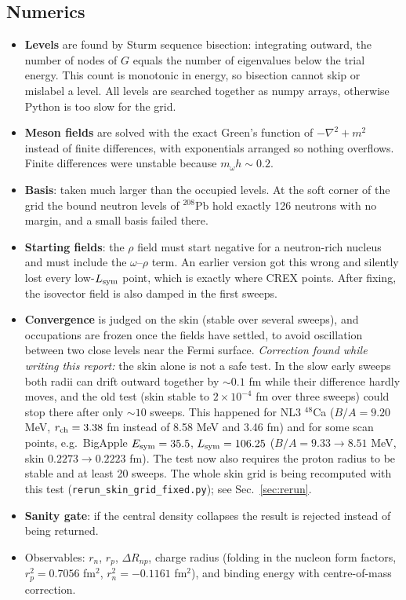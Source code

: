 \documentclass[11pt,a4paper]{article}
\newcommand{\Esym}{E_{\rm sym}}
\newcommand{\Lsym}{L_{\rm sym}}
\newcommand{\DRnp}{\Delta R_{np}}
\begin{document}
\subsection{Numerics}
\begin{itemize}
\item \textbf{Levels} are found by Sturm sequence bisection: integrating outward, the number of nodes of $G$ equals the number of eigenvalues below the trial energy. This count is monotonic in energy, so bisection cannot skip or mislabel a level. All levels are searched together as numpy arrays, otherwise Python is too slow for the grid.
\item \textbf{Meson fields} are solved with the exact Green's function of $-\nabla^2+m^2$ instead of finite differences, with exponentials arranged so nothing overflows. Finite differences were unstable because $m_\omega h\sim0.2$.
\item \textbf{Basis}: taken much larger than the occupied levels. At the soft corner of the grid the bound neutron levels of $^{208}$Pb hold exactly 126 neutrons with no margin, and a small basis failed there.
\item \textbf{Starting fields}: the $\rho$ field must start negative for a neutron-rich nucleus and must include the $\omega$--$\rho$ term. An earlier version got this wrong and silently lost every low-$\Lsym$ point, which is exactly where CREX points. After fixing, the isovector field is also damped in the first sweeps.
\item \textbf{Convergence} is judged on the skin (stable over several sweeps), and occupations are frozen once the fields have settled, to avoid oscillation between two close levels near the Fermi surface. \emph{Correction found while writing this report:} the skin alone is not a safe test. In the slow early sweeps both radii can drift outward together by $\sim0.1$ fm while their difference hardly moves, and the old test (skin stable to $2\times10^{-4}$ fm over three sweeps) could stop there after only $\sim10$ sweeps. This happened for NL3 $^{48}$Ca ($B/A=9.20$ MeV, $r_{\rm ch}=3.38$ fm instead of 8.58 MeV and 3.46 fm) and for some scan points, e.g.\ BigApple $\Esym=35.5$, $\Lsym=106.25$ ($B/A=9.33\to8.51$ MeV, skin $0.2273\to0.2223$ fm). The test now also requires the proton radius to be stable and at least 20 sweeps. The whole skin grid is being recomputed with this test (\texttt{rerun\_skin\_grid\_fixed.py}); see Sec.~\ref{sec:rerun}.
\item \textbf{Sanity gate}: if the central density collapses the result is rejected instead of being returned.
\item Observables: $r_n$, $r_p$, $\DRnp$, charge radius (folding in the nucleon form factors, $r_p^2=0.7056$ fm$^2$, $r_n^2=-0.1161$ fm$^2$), and binding energy with centre-of-mass correction.
\end{itemize}
\end{document}

